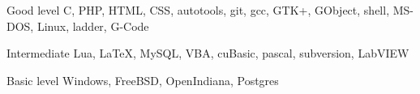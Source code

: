 \documentclass{tccv}
\begin{document}
\begin{factlist}

\item{Good level}
     {C, PHP, HTML, CSS, autotools, git, gcc, GTK+, GObject, shell,
      MS-DOS, Linux, ladder, G-Code}

\item{Intermediate}
     {Lua, \LaTeX, MySQL, VBA, cuBasic, pascal, subversion, LabVIEW}

\item{Basic level}
     {Windows, FreeBSD, OpenIndiana, Postgres}

\end{factlist}
\end{document}
